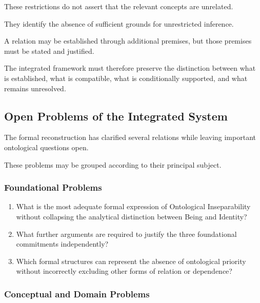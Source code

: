 These restrictions
do not assert
that the relevant
concepts are unrelated.

They identify
the absence
of sufficient
grounds for
unrestricted inference.

A relation may
be established
through additional
premises, but
those premises
must be stated
and justified.

The integrated framework
must therefore preserve
the distinction between
what is established,
what is compatible,
what is conditionally
supported, and
what remains
unresolved.

\subsection{Open Problems of the Integrated System}

The formal reconstruction
has clarified several
relations while
leaving important
ontological questions
open.

These problems
may be grouped
according to
their principal
subject.

\subsubsection{Foundational Problems}

\begin{enumerate}
    \item What is
    the most
    adequate formal
    expression of
    Ontological Inseparability
    without collapsing
    the analytical
    distinction between
    Being and
    Identity?

    \item What further
    arguments are
    required to
    justify the
    three foundational
    commitments independently?

    \item Which formal
    structures can
    represent the
    absence of
    ontological priority
    without incorrectly
    excluding other
    forms of
    relation or
    dependence?
\end{enumerate}

\subsubsection{Conceptual and Domain Problems}

